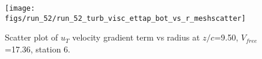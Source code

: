 \begin{figure}[H]
\centering
\texttt{[image: figs/run\_52/run\_52\_turb\_visc\_ettap\_bot\_vs\_r\_meshscatter]}
\caption{Scatter plot of $
u_T$ velocity gradient term vs radius at $z/c$=9.50, $V_{free}$=17.36, station 6.}
\end{figure}



